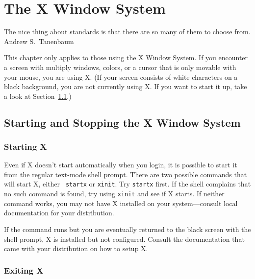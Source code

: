 \chapter{The X Window System}\label{x-chapter}

\begin{fortune}
The nice thing about standards is that there are so many of them to
choose from.\\
\raggedleft Andrew S.~Tanenbaum
\end{fortune}


\xwarn This chapter only applies to those using the X Window
System.  If you encounter a screen with multiply windows, colors, or a
cursor that is only movable with your mouse, you are using X. (If
your screen consists of white characters on a black background, you
are not currently using X.  If you want to start it up, take a look at
Section~\ref{x-start-stop-section}.)

\section{Starting and Stopping the X Window System}\label{x-start-stop-section}

\subsection{Starting X}

Even if X doesn't start automatically when you login, it is possible
to start it from the regular text-mode shell prompt.  There are two
possible commands that will start X, either {\tt
  startx} or {\tt xinit}. Try
{\tt startx} first. If the shell complains that no such command is
found, try using {\tt xinit} and see if X starts. If neither command
works, you may not have X installed on your system---consult local
documentation for your distribution.

If the command runs but you are eventually returned to the black
screen with the shell prompt, X is installed but not configured.
Consult the documentation that came with your distribution on how to
setup X.

\subsection{Exiting X}


